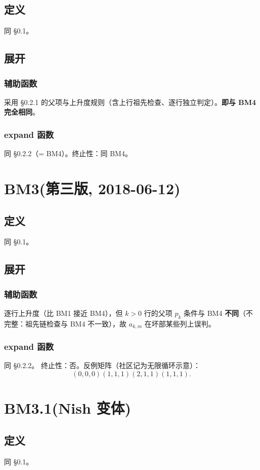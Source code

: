\documentclass[UTF8]{ctexart}
\begin{document}
\subsection{定义}
同 \S 0.1。

\subsection{展开}
\subsubsection{辅助函数}
采用 \S 0.2.1 的父项与上升度规则（含上行祖先检查、逐行独立判定）。\textbf{即与 BM4 完全相同}。

\subsubsection{expand 函数}
同 \S 0.2.2（= BM4）。终止性：同 BM4。

\section{BM3(第三版, 2018-06-12)}
\subsection{定义}
同 \S 0.1。

\subsection{展开}
\subsubsection{辅助函数}
逐行上升度（比 BM1 接近 BM4），但 $k>0$ 行的父项 $p_k$ 条件与 BM4 \textbf{不同}（不完整：祖先链检查与 BM4 不一致），故 $a_{k,m}$ 在坏部某些列上误判。

\subsubsection{expand 函数}
同 \S 0.2.2。
终止性：否。反例矩阵（社区记为无限循环示意）：
\[
(0,0,0)(1,1,1)(2,1,1)(1,1,1).
\]

\section{BM3.1(Nish 变体)}
\subsection{定义}
同 \S 0.1。
\end{document}
